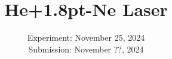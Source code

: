 

\usepackage{xspace}
\usepackage{makecell}
\newcommand{\HeNe}{He\texorpdfstring{\kern+1.2pt}{}-Ne\xspace}

\publishers{TU Dortmund – Department of Physics}

\subject{\texorpdfstring{\vspace{2ex}}{}V61\texorpdfstring{\vspace{-2ex}}{}} %
\title{He\texorpdfstring{\kern+1.8pt}{}-Ne Laser} %
\date{
	Experiment: November 25, 2024 %
	\\ Submission: November ??, 2024 %
}




\maketitle
\thispagestyle{empty}

\tableofcontents
\newpage








\printbibliography{}

\newpage



